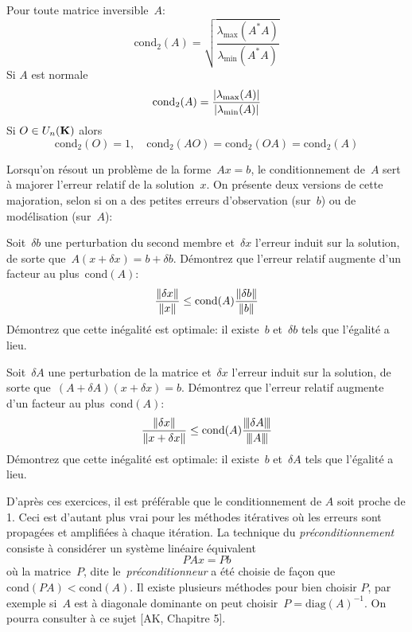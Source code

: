 \begin{proposition} Pour toute matrice
	inversible~$A$:
\[
\mathrm{cond}_2(A) = \sqrt{\frac{\lambda_{\max}(A^*A)}{\lambda_{\min}(A^*A)}}
\]
Si $A$ est normale
\[
\mathrm{cond}_2(A) = \frac{\left|\lambda_{\max}(A)\right|}{\left|\lambda_{\min}(A)\right|}
\]
Si $O \in U_n(\mathbf{K})$ alors
\[
\mathrm{cond}_2(O) = 1, \quad \mathrm{cond}_2(AO) = \mathrm{cond}_2(OA) = \mathrm{cond}_2(A)
\]
\end{proposition}

Lorsqu'on résout un problème de la forme~$Ax=b$, le conditionnement de~$A$
sert à majorer l'erreur relatif de la solution~$x$.  On présente deux
versions de cette majoration, selon si on a des petites erreurs d'observation
(sur~$b$) ou de modélisation (sur~$A$):

\begin{exercice}
	Soit~$\delta b$ une perturbation du second membre et~$\delta x$ l'erreur
	induit sur la solution, de sorte que~$A(x+\delta x)=b+\delta b$.  Démontrez
	que l'erreur relatif augmente d'un facteur au plus~$\mathrm{cond}(A)$:
	\[
		\frac{\left\|\delta x\right\|}{\left\|x\right\|}
		\le
		\mathrm{cond}(A)
		\frac{\left\|\delta b\right\|}{\left\|b\right\|}
	\]
	Démontrez que cette inégalité est optimale: il existe~$b$ et~$\delta
	b$ tels que l'égalité a lieu.
\end{exercice}


\begin{exercice}
	Soit~$\delta A$ une perturbation de la matrice et~$\delta x$ l'erreur
	induit sur la solution, de sorte que~$(A+\delta A)(x+\delta x)=b$.  Démontrez
	que l'erreur relatif augmente d'un facteur au plus~$\mathrm{cond}(A)$:
	\[
		\frac{\left\|\delta x\right\|}{\left\|x+\delta x\right\|}
		\le
		\mathrm{cond}(A)
		\frac{{\left\vert\kern-0.25ex\left\vert\kern-0.25ex\left\vert \delta A \right\vert\kern-0.25ex\right\vert\kern-0.25ex\right\vert}}{{\left\vert\kern-0.25ex\left\vert\kern-0.25ex\left\vert A \right\vert\kern-0.25ex\right\vert\kern-0.25ex\right\vert}}
	\]
	Démontrez que cette inégalité est optimale: il existe~$b$ et~$\delta
	A$ tels que l'égalité a lieu.
\end{exercice}

\begin{remark}
	D'après ces exercices, il est préférable que le conditionnement de $A$ soit
	proche de 1. Ceci est d'autant plus vrai pour les méthodes itératives où
	les erreurs sont propagées et amplifiées à chaque itération. La technique
	du \emph{préconditionnement} consiste à considérer un système linéaire
	équivalent
	\[
		PAx = Pb
	\]
	où la matrice~$P$, dite le~\emph{préconditionneur} a été choisie de façon
	que $\mathrm{cond} (PA) < \mathrm{cond}(A)$. Il existe plusieurs méthodes
	pour bien choisir $P$, par exemple si~$A$ est à diagonale dominante on peut
	choisir~$P=\mathrm{diag}(A)^{-1}$.
	On pourra consulter à ce sujet [AK, Chapitre 5].
\end{remark}

